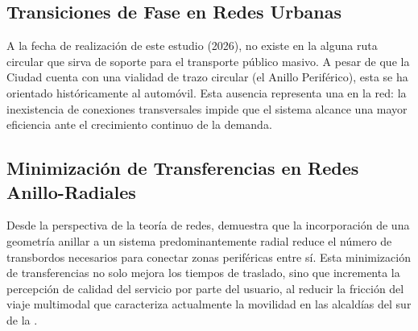 \subsection{Transiciones de Fase en Redes Urbanas}
\label{subsec:transiciones-fase}

A la fecha de realización de este estudio (2026), no existe en la \cdmx{} alguna
ruta circular que sirva de soporte para el transporte público masivo.
A pesar de que la Ciudad cuenta con una vialidad de trazo circular (el Anillo
Periférico), esta se ha orientado históricamente al automóvil. Esta
ausencia representa una  en la red: la inexistencia
de conexiones transversales impide que el sistema alcance una mayor eficiencia
ante el crecimiento continuo de la demanda.

\subsection{Minimización de Transferencias en Redes Anillo-Radiales}
\label{subsec:minimizacion-transferencias}

Desde la perspectiva de la teoría de redes, \citet{owais2020} demuestra que la
incorporación de una geometría anillar a un sistema predominantemente radial
reduce el número de transbordos necesarios para conectar zonas periféricas entre
sí. Esta minimización de transferencias no solo mejora los tiempos de traslado,
sino que incrementa la percepción de calidad del servicio por parte del usuario,
al reducir la fricción del viaje multimodal que caracteriza actualmente la
movilidad en las alcaldías del sur de la \cdmx{}.


